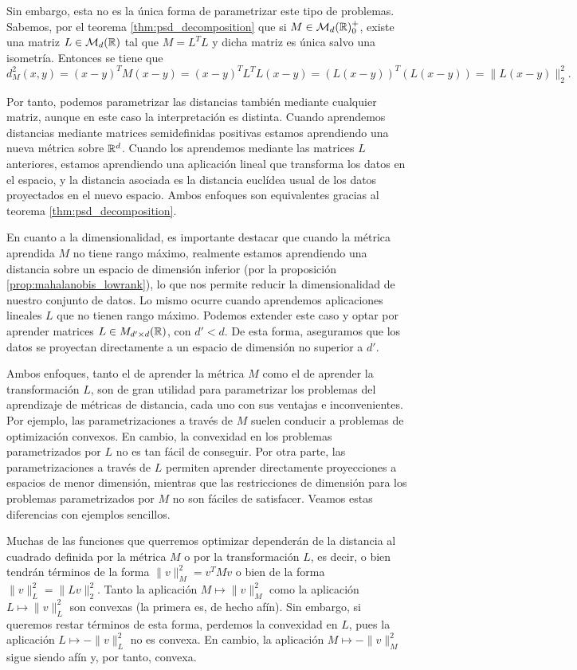     Sin embargo, esta no es la única forma de parametrizar este tipo de problemas. Sabemos, por el teorema \ref{thm:psd_decomposition} que si $M \in \mathcal{M}_d(\mathbb{R})^+_0$, existe una matriz $L \in \mathcal{M}_d(\mathbb{R})$ tal que $M = L^TL$ y dicha matriz es única salvo una isometría. Entonces se tiene que
    \[d_M^2(x,y) = (x-y)^TM(x-y) =(x-y)^TL^TL(x-y) = (L(x-y))^T(L(x-y)) = \|L(x-y)\|_2^2. \]

    Por tanto, podemos parametrizar las distancias también mediante cualquier matriz, aunque en este caso la interpretación es distinta. Cuando aprendemos distancias mediante matrices semidefinidas positivas estamos aprendiendo una nueva métrica sobre $\mathbb{R}^d$. Cuando los aprendemos mediante las matrices $L$ anteriores, estamos aprendiendo una aplicación lineal que transforma los datos en el espacio, y la distancia asociada es la distancia euclídea usual de los datos proyectados en el nuevo espacio. Ambos enfoques son equivalentes gracias al teorema \ref{thm:psd_decomposition}.

    En cuanto a la dimensionalidad, es importante destacar que cuando la métrica aprendida $M$ no tiene rango máximo, realmente estamos aprendiendo una distancia sobre un espacio de dimensión inferior (por la proposición \ref{prop:mahalanobis_lowrank}), lo que nos permite reducir la dimensionalidad de nuestro conjunto de datos. Lo mismo ocurre cuando aprendemos aplicaciones lineales $L$ que no tienen rango máximo. Podemos extender este caso y optar por aprender matrices $L \in M_{d'\times d}(\mathbb{R})$, con $d' < d$. De esta forma, aseguramos que los datos se proyectan directamente a un espacio de dimensión no superior a $d'$.

    Ambos enfoques, tanto el de aprender la métrica $M$ como el de aprender la transformación $L$, son de gran utilidad para parametrizar los problemas del aprendizaje de métricas de distancia, cada uno con sus ventajas e inconvenientes. Por ejemplo, las parametrizaciones a través de $M$ suelen conducir a problemas de optimización convexos. En cambio, la convexidad en los problemas parametrizados por $L$ no es tan fácil de conseguir. Por otra parte, las parametrizaciones a través de $L$ permiten aprender directamente proyecciones a espacios de menor dimensión, mientras que las restricciones de dimensión para los problemas parametrizados por $M$ no son fáciles de satisfacer. Veamos estas diferencias con ejemplos sencillos.

    \begin{example}
        Muchas de las funciones que querremos optimizar dependerán de la distancia al cuadrado definida por la métrica $M$ o por la transformación $L$, es decir, o bien tendrán términos de la forma $\|v\|_M^2 = v^TMv$ o bien de la forma $\|v\|_L^2 = \|Lv\|_2^2$. Tanto la aplicación $M \mapsto \|v\|_M^2$ como la aplicación $L \mapsto \|v\|_L^2$ son convexas (la primera es, de hecho afín). Sin embargo, si queremos restar términos de esta forma, perdemos la convexidad en $L$, pues la aplicación $L \mapsto -\|v\|_L^2$ no es convexa. En cambio, la aplicación $M \mapsto -\|v\|_M^2$ sigue siendo afín y, por tanto, convexa.
    \end{example}


